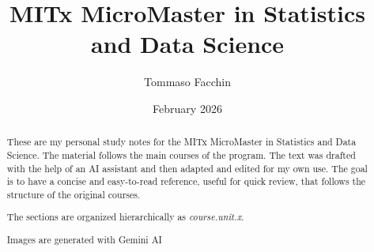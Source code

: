 \documentclass{article}
\title{MITx MicroMaster in Statistics and Data Science}
\author{Tommaso Facchin}
\date{February 2026}
\begin{document}
\maketitle

\begin{abstract}
\noindent These are my personal study notes for the MITx MicroMaster
in Statistics and Data Science.
The material follows the main courses of the program.
The text was drafted with the help of an AI assistant and then
adapted and edited for my own use.
The goal is to have a concise and easy-to-read reference,
useful for quick review, that follows the structure
of the original courses.

\noindent The sections are organized hierarchically as \textit{course.unit.x}.

\noindent Images are generated with Gemini AI
\end{abstract}



\setlength{\parindent}{0pt}
\setcounter{tocdepth}{2} 
\tableofcontents

\newpage


\end{document}
